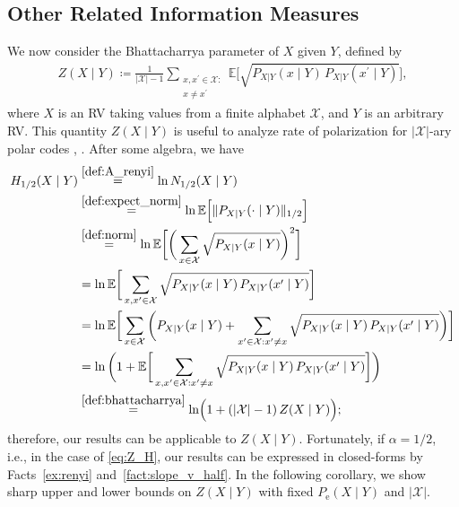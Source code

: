 \documentclass[conference, draftcls, onecolumn]{IEEEtran}
\theoremstyle{plain}
\begin{document}
\subsection{Other Related Information Measures}


We now consider the Bhattacharrya parameter \cite[Definition~17]{mori} of $X$ given $Y$, defined by
\begin{align}
Z(X \mid Y)
\coloneqq
\frac{ 1 }{ |\mathcal{X}|-1 } \sum_{\substack{ x, x^{\prime} \in \mathcal{X} : \\ x \neq x^{\prime}}} \mathbb{E} \bigg[ \sqrt{ P_{X|Y}(x \mid Y) \, P_{X|Y}(x^{\prime} \mid Y) } \bigg] ,
\label{def:bhattacharrya}
\end{align}
where $X$ is an RV taking values from a finite alphabet $\mathcal{X}$, and $Y$ is an arbitrary RV.
This quantity $Z(X \mid Y)$ is useful to analyze rate of polarization for $|\mathcal{X}|$-ary polar codes \cite[Section~VII-B]{mori}, \cite[Section~4.1.2]{sasoglu}.
After some algebra, we have
\begin{align}
H_{1/2}(X \mid Y)
& \overset{\eqref{def:A_renyi}}{=}
\ln N_{1/2}(X \mid Y)
\\
& \overset{\eqref{def:expect_norm}}{=}
\ln \mathbb{E} \Big[ \| P_{X|Y}(\cdot \mid Y) \|_{1/2} \Big]
\\
& \overset{\eqref{def:norm}}{=}
\ln \mathbb{E} \bigg[ \bigg( \sum_{x \in \mathcal{X}} \sqrt{ P_{X|Y}(x \mid Y) } \bigg)^{2} \bigg]
\\
& =
\ln \mathbb{E} \bigg[ \sum_{x, x^{\prime} \in \mathcal{X}} \sqrt{ P_{X|Y}(x \mid Y) \, P_{X|Y}(x^{\prime} \mid Y) } \bigg]
\\
& =
\ln \mathbb{E} \bigg[ \sum_{x \in \mathcal{X}} \bigg( P_{X|Y}(x \mid Y) + \sum_{x^{\prime} \in \mathcal{X} : x^{\prime} \neq x} \sqrt{ P_{X|Y}(x \mid Y) \, P_{X|Y}(x^{\prime} \mid Y) } \bigg) \bigg]
\\
& =
\ln \bigg( 1 + \mathbb{E} \bigg[ \sum_{x, x^{\prime} \in \mathcal{X} : x^{\prime} \neq x} \sqrt{ P_{X|Y}(x \mid Y) \, P_{X|Y}(x^{\prime} \mid Y) } \bigg] \bigg)
\\
& \overset{\eqref{def:bhattacharrya}}{=}
\ln \! \Big( 1 + (|\mathcal{X}| - 1) \, Z(X \mid Y) \Big) ;
\label{eq:Z_H}
\end{align}
therefore, our results can be applicable to $Z(X \mid Y)$.
Fortunately, if $\alpha = 1/2$, i.e., in the case of \eqref{eq:Z_H}, our results can be expressed in closed-forms by Facts~\ref{ex:renyi} and~\ref{fact:slope_v_half}.
In the following corollary, we show sharp upper and lower bounds on $Z(X \mid Y)$ with fixed $P_{\mathrm{e}}(X \mid Y)$ and $|\mathcal{X}|$.
\end{document}
